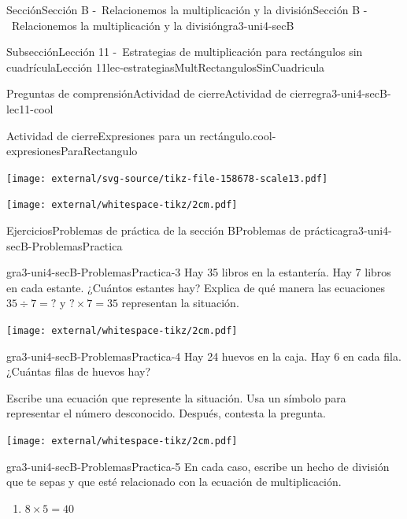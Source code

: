 \begin{sectionptx}{Sección}{Sección B -~Relacionemos la multiplicación y la división}{}{Sección B -~Relacionemos la multiplicación y la división}{}{}{gra3-uni4-secB}
\begin{subsectionptx}{Subsección}{Lección 11 -~Estrategias de multiplicación para rectángulos sin cuadrícula}{}{Lección 11}{}{}{lec-estrategiasMultRectangulosSinCuadricula}
\begin{reading-questions-subsubsection}{Preguntas de comprensión}{Actividad de cierre}{}{Actividad de cierre}{}{}{gra3-uni4-secB-lec11-cool}
\begin{project}{Actividad de cierre}{Expresiones para un rectángulo.}{cool-expresionesParaRectangulo}
\begin{sidebyside}{2}{0}{0}{0}
\begin{sbspanel}{0.6}
\begin{enumerate}[label={(\alph*)}]
\end{enumerate}
\end{sbspanel}%
\begin{sbspanel}{0.4}%
\texttt{[image: external/svg-source/tikz-file-158678-scale13.pdf]}
\end{sbspanel}%
\end{sidebyside}%
\begin{image}{0}{1}{0}{}%
\texttt{[image: external/whitespace-tikz/2cm.pdf]}
\end{image}%
\end{project}%
\end{reading-questions-subsubsection}
\end{subsectionptx}
%
%
\typeout{************************************************}
\typeout{************************************************}
%
\begin{exercises-subsection}{Ejercicios}{Problemas de práctica de la sección B}{}{Problemas de práctica}{}{}{gra3-uni4-secB-ProblemasPractica}
\begin{divisionexercise}{1}{}{}{gra3-uni4-secB-ProblemasPractica-3}%
Hay 35 libros en la estantería. Hay 7 libros en cada estante. ¿Cuántos estantes hay? Explica de qué manera las ecuaciones \(35 \div 7 = {?}\) y \({?} \times 7 = 35\) representan la situación.%
\begin{image}{0}{1}{0}{}%
\texttt{[image: external/whitespace-tikz/2cm.pdf]}
\end{image}%
\end{divisionexercise}%
\begin{divisionexercise}{2}{}{}{gra3-uni4-secB-ProblemasPractica-4}%
Hay 24 huevos en la caja. Hay 6 en cada fila. ¿Cuántas filas de huevos hay?%
\par
Escribe una ecuación que represente la situación. Usa un símbolo para representar el número desconocido. Después, contesta la pregunta.%
\begin{image}{0}{1}{0}{}%
\texttt{[image: external/whitespace-tikz/2cm.pdf]}
\end{image}%
\end{divisionexercise}%
\begin{divisionexercise}{3}{}{}{gra3-uni4-secB-ProblemasPractica-5}%
En cada caso, escribe un hecho de división que te sepas y que esté relacionado con la ecuación de multiplicación.%
%
\begin{enumerate}[label={(\alph*)}]
\item{}\(\displaystyle 8 \times 5 = 40\)%

\end{enumerate}
\end{divisionexercise}
\end{exercises-subsection}
\end{sectionptx}
